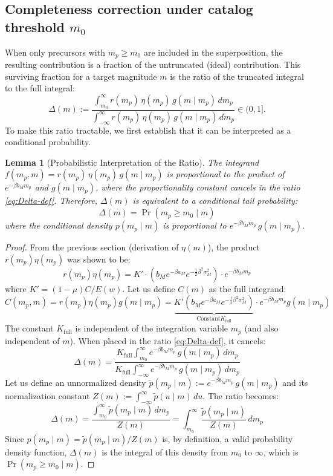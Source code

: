 \documentclass[extra,mreferee]{gji}
\theoremstyle{lemma}
\newtheorem{lemma}{Lemma}
\begin{document}
\medskip
\subsection{Completeness correction under catalog threshold \texorpdfstring{$m_0$}{m0}}
When only precursors with $m_p\ge m_0$ are included in the superposition, the resulting contribution is a fraction of the untruncated (ideal) contribution. This surviving fraction for a target magnitude $m$ is the ratio of the truncated integral to the full integral:
\begin{equation}\label{eq:Delta-def}
  \Delta(m):=
  \frac{\displaystyle\int_{m_0}^{\infty} r(m_p)\,\eta(m_p)\,g(m\mid m_p)\,dm_p}
       {\displaystyle\int_{-\infty}^{\infty} r(m_p)\,\eta(m_p)\,g(m\mid m_p)\,dm_p}\in(0,1].
\end{equation}
To make this ratio tractable, we first establish that it can be interpreted as a conditional probability.

\begin{lemma}[Probabilistic Interpretation of the Ratio]
The integrand $f(m_p, m) = r(m_p)\,\eta(m_p)\,g(m\mid m_p)$ is proportional to the product of $e^{-\beta b_M m_p}$ and $g(m\mid m_p)$, where the proportionality constant cancels in the ratio \eqref{eq:Delta-def}. Therefore, $\Delta(m)$ is equivalent to a conditional tail probability:
\[
\Delta(m) = \Pr(m_p\ge m_0\mid m)
\]
where the conditional density $p(m_p \mid m)$ is proportional to $e^{-\beta b_M m_p}\,g(m\mid m_p)$.
\end{lemma}

\begin{proof}
From the previous section (derivation of $\eta(m)$), the product $r(m_p)\eta(m_p)$ was shown to be:
\[
r(m_p)\eta(m_p) = K' \cdot \left( b_M e^{-\beta a_M} e^{-\frac{1}{2}\beta^2 \sigma_M^2} \right) \cdot e^{-\beta b_M m_p}
\]
where $K' = (1-\mu)C / E(w)$. Let us define $C(m)$ as the full integrand:
\[
C(m_p, m) = r(m_p)\eta(m_p)g(m\mid m_p) = \underbrace{K' \left( b_M e^{-\beta a_M} e^{-\frac{1}{2}\beta^2 \sigma_M^2} \right)}_{\mathrm{Constant } K_{\mathrm{full}}} \cdot e^{-\beta b_M m_p} g(m\mid m_p)
\]
The constant $K_{\mathrm{full}}$ is independent of the integration variable $m_p$ (and also independent of $m$). When placed in the ratio \eqref{eq:Delta-def}, it cancels:
\[
\Delta(m) = \frac{\displaystyle K_{\mathrm{full}} \int_{m_0}^{\infty} e^{-\beta b_M m_p}\,g(m\mid m_p)\,dm_p}
          {\displaystyle K_{\mathrm{full}} \int_{-\infty}^{\infty} e^{-\beta b_M m_p}\,g(m\mid m_p)\,dm_p}
\]
Let us define an unnormalized density $\tilde{p}(m_p\mid m) := e^{-\beta b_M m_p}\,g(m\mid m_p)$ and its normalization constant $Z(m) := \int_{-\infty}^{\infty}\tilde{p}(u\mid m)\,du$. The ratio becomes:
\[
\Delta(m) = \frac{\displaystyle\int_{m_0}^{\infty} \tilde{p}(m_p\mid m)\,dm_p}{Z(m)} = \int_{m_0}^{\infty} \frac{\tilde{p}(m_p\mid m)}{Z(m)}\,dm_p
\]
Since $p(m_p \mid m) = \tilde{p}(m_p\mid m) / Z(m)$ is, by definition, a valid probability density function, $\Delta(m)$ is the integral of this density from $m_0$ to $\infty$, which is $\Pr(m_p\ge m_0\mid m)$.
\end{proof}
\end{document}
